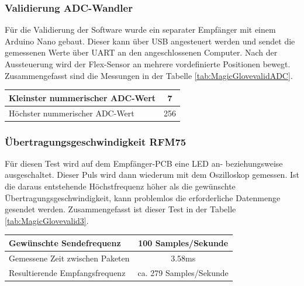 \subsubsection*{Validierung ADC-Wandler}
Für die Validierung der Software wurde ein separater Empfänger mit einem Arduino Nano gebaut. Dieser kann über USB angesteuert werden und sendet die gemessenen Werte über UART an den angeschlossenen Computer.
Nach der Aussteuerung wird der Flex-Sensor an mehrere vordefinierte Positionen bewegt. Zusammengefasst sind die Messungen in der Tabelle \ref{tab:MagicGlovevalidADC}.
\begin{center}
	\begin{tabular}{l|c}
		\hline 
		Kleinster nummerischer ADC-Wert & 7 \\ \hline
		Höchster nummerischer ADC-Wert & 256 \\ \hline
	\end{tabular} 
	\label{tab:MagicGlovevalidADC}
\end{center}

\subsubsection*{Übertragungsgeschwindigkeit RFM75}
Für diesen Test wird auf dem Empfänger-PCB eine LED an- beziehungsweise ausgeschaltet. Dieser Puls wird dann wiederum mit dem Oszilloskop gemessen. Ist die daraus entstehende Höchstfrequenz höher als die gewünschte Übertragungsgeschwindigkeit, kann problemlos die erforderliche Datenmenge gesendet werden. Zusammengefasst ist dieser Test in der Tabelle \ref{tab:MagicGlovevalid3}.
\begin{center}
	\begin{tabular}{l|c}
		\hline 
		Gewünschte Sendefrequenz & 100 Samples/Sekunde \\ \hline
		Gemessene Zeit zwischen Paketen & 3.58ms \\ \hline
		Resultierende Empfangsfrequenz & ca. 279 Samples/Sekunde \\ \hline
	\end{tabular} 
	\label{tab:MagicGlovevalid3}
\end{center}
